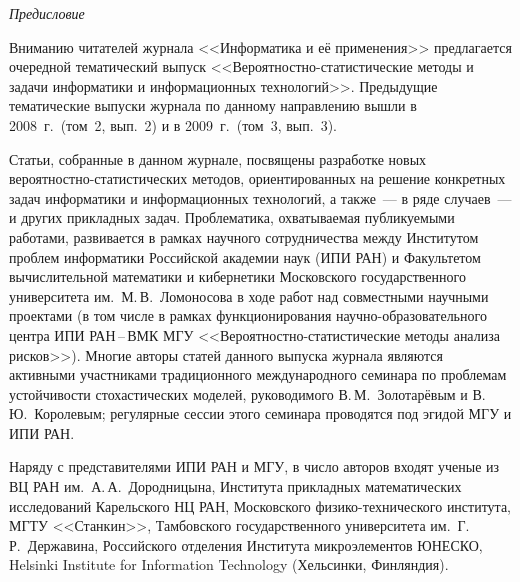 { %
{ %

\vspace*{-48pt}
\begin{center}\LARGE
\textit{Предисловие}
\end{center}


\vspace*{9mm}

\thispagestyle{empty}

{\small

    
      Вниманию читателей журнала <<Информатика и её применения>> предлагается 
очередной тематический выпуск <<Вероятностно-статистические методы и задачи 
информатики и информационных технологий>>. Предыдущие тематические выпуски 
журнала по данному направлению вышли в 2008~г.\ (том~2, вып.~2) и в 2009~г.\ (том~3, 
вып.~3). 
      
      Статьи, собранные в данном журнале, посвящены разработке новых вероятностно-статистических 
      методов, ориентированных на решение конкретных задач 
информатики и информационных технологий, а также~--- в ряде случаев~--- и других 
прикладных задач. Проблематика, охватываемая публикуемыми работами, развивается в 
рамках научного сотрудничества между Институтом проблем информатики Российской 
академии наук (ИПИ РАН) и Факультетом вычислительной математики и кибернетики 
Мос\-ков\-ско\-го государственного университета им.~М.\,В.~Ломоносова в ходе работ над 
сов\-местными научными проектами (в том числе в рамках функционирования
научно-образовательного центра ИПИ РАН\,--\,ВМК МГУ <<Вероятностно-статистические 
методы анализа рисков>>). Многие авторы статей данного выпуска
журнала являются активными участниками традиционного международного семинара по 
проблемам устойчивости стохастических моделей, руководимого В.\,М.~Золотарёвым и 
В.\,Ю.~Королевым; регулярные сессии этого семинара проводятся под эгидой МГУ и 
ИПИ РАН. 
      
      Наряду с представителями ИПИ РАН и МГУ, в число авторов 
      входят ученые из ВЦ РАН им.~А.\,А.~Дородницына, Института прикладных 
математических исследований Карельского НЦ РАН, Московского физико-технического 
института, МГТУ <<Станкин>>, Тамбовского государственного университета им.\ 
Г.\,Р.~Державина, Российского отделения Института микроэлементов ЮНЕСКО, Helsinki 
Institute for Information Technology (Хельсинки, Финляндия).
      
}}}
